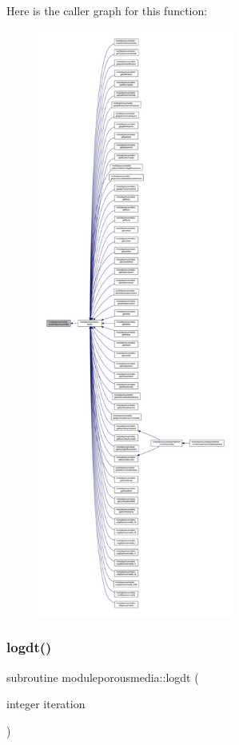 Here is the caller graph for this function\+:\nopagebreak
\begin{figure}[H]
\begin{center}
\leavevmode
\includegraphics[height=550pt]{namespacemoduleporousmedia_ac6ac9e34fbd80443bbf33b5006e8b25e_icgraph}
\end{center}
\end{figure}
\mbox{\label{namespacemoduleporousmedia_aefd72c2c51be03528321ec53d37a595c}} 
\subsubsection{\texorpdfstring{logdt()}{logdt()}}
{\footnotesize\ttfamily subroutine moduleporousmedia\+::logdt (\begin{DoxyParamCaption}\item[{integer}]{iteration }\end{DoxyParamCaption})\hspace{0.3cm}{\ttfamily [private]}}

